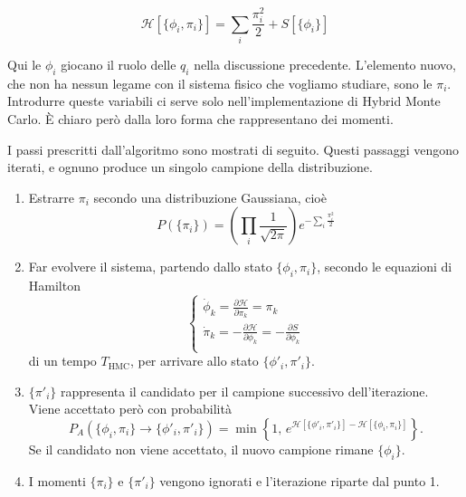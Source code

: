 \documentclass[11pt, a4paper]{article}
\begin{document}
\begin{equation}
  \mathcal{H}[\{\phi_i, \pi_i\}] = \sum_{i} \frac{\pi_i^2}{2} + S[\{\phi_i\}]
\end{equation}

Qui le $\phi_i$ giocano il ruolo delle $q_i$ nella discussione precedente. L'elemento nuovo, che non ha nessun legame con il sistema fisico che vogliamo studiare, sono le $\pi_i$.
Introdurre queste variabili ci serve solo nell'implementazione di Hybrid Monte Carlo.
\`E chiaro però dalla loro forma che rappresentano dei momenti.

I passi prescritti dall'algoritmo sono mostrati di seguito. Questi passaggi vengono iterati, e ognuno produce un singolo campione della distribuzione.

\begin{enumerate}
  \item Estrarre ${\pi_i}$ secondo una distribuzione Gaussiana, cioè
  \begin{equation}
    P(\{\pi_i\}) = \left(\prod_i \frac{1}{\sqrt{2 \pi}}\right) e^{-\sum_i \frac{\pi_i^2}{2}}
  \end{equation}
  \item Far evolvere il sistema, partendo dallo stato $\{\phi_i, \pi_i\}$, secondo le equazioni di Hamilton
  \begin{equation}
    \begin{cases}
      \dot{\phi}_k = \frac{\partial \mathcal{H}}{\partial \pi_k} = \pi_k \\
      \dot{\pi}_k = -\frac{\partial \mathcal{H}}{\partial \phi_k} = -\frac{\partial S}{\partial \phi_k} \\
    \end{cases}
  \end{equation}
  di un tempo $T_\text{HMC}$, per arrivare allo stato $\{\phi'_i, \pi'_i\}$.
  \item $\{\pi'_i\}$ rappresenta il candidato per il campione successivo dell'iterazione. Viene accettato però con probabilità
  \begin{equation}
    P_A \left(\{\phi_i, \pi_i\} \rightarrow \{\phi'_i, \pi'_i\} \right) = \min\left\{1,\, e^{\mathcal{H}[\{\phi'_i, \pi'_i\}] - \mathcal{H}[\{\phi_i, \pi_i\}]}\right\}.
  \end{equation}
  Se il candidato non viene accettato, il nuovo campione rimane $\{\phi_i\}$.
  \item I momenti $\{\pi_i\}$ e $\{\pi'_i\}$ vengono ignorati e l'iterazione riparte dal punto 1.
\end{enumerate}
\end{document}

